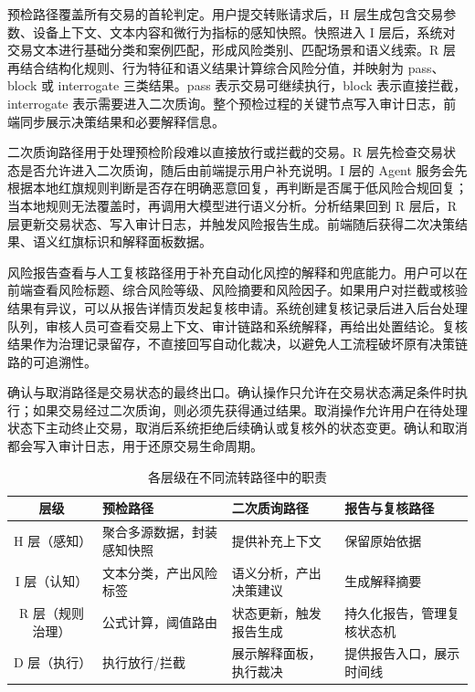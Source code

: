 \documentclass{xduugthesis}
\begin{document}
预检路径覆盖所有交易的首轮判定。用户提交转账请求后，H 层生成包含交易参数、设备上下文、文本内容和微行为指标的感知快照。快照进入 I 层后，系统对交易文本进行基础分类和案例匹配，形成风险类别、匹配场景和语义线索。R 层再结合结构化规则、行为特征和语义结果计算综合风险分值，并映射为 pass、block 或 interrogate 三类结果。pass 表示交易可继续执行，block 表示直接拦截，interrogate 表示需要进入二次质询。整个预检过程的关键节点写入审计日志，前端同步展示决策结果和必要解释信息。

二次质询路径用于处理预检阶段难以直接放行或拦截的交易。R 层先检查交易状态是否允许进入二次质询，随后由前端提示用户补充说明。I 层的 Agent 服务会先根据本地红旗规则判断是否存在明确恶意回复，再判断是否属于低风险合规回复；当本地规则无法覆盖时，再调用大模型进行语义分析。分析结果回到 R 层后，R 层更新交易状态、写入审计日志，并触发风险报告生成。前端随后获得二次决策结果、语义红旗标识和解释面板数据。

风险报告查看与人工复核路径用于补充自动化风控的解释和兜底能力。用户可以在前端查看风险标题、综合风险等级、风险摘要和风险因子。如果用户对拦截或核验结果有异议，可以从报告详情页发起复核申请。系统创建复核记录后进入后台处理队列，审核人员可查看交易上下文、审计链路和系统解释，再给出处置结论。复核结果作为治理记录留存，不直接回写自动化裁决，以避免人工流程破坏原有决策链路的可追溯性。

确认与取消路径是交易状态的最终出口。确认操作只允许在交易状态满足条件时执行；如果交易经过二次质询，则必须先获得通过结果。取消操作允许用户在待处理状态下主动终止交易，取消后系统拒绝后续确认或复核外的状态变更。确认和取消都会写入审计日志，用于还原交易生命周期。

\begin{table}[H]
    \centering
    \caption{各层级在不同流转路径中的职责}
    \label{tab:layer-flow-resp}
    \begin{tabularx}{\linewidth}{|c|Y|Y|Y|}
        \hline
        层级 & 预检路径 & 二次质询路径 & 报告与复核路径 \\
        \hline
        H 层（感知） & 聚合多源数据，封装感知快照 & 提供补充上下文 & 保留原始依据 \\
        \hline
        I 层（认知） & 文本分类，产出风险标签 & 语义分析，产出决策建议 & 生成解释摘要 \\
        \hline
        R 层（规则治理） & 公式计算，阈值路由 & 状态更新，触发报告生成 & 持久化报告，管理复核状态机 \\
        \hline
        D 层（执行） & 执行放行/拦截 & 展示解释面板，执行裁决 & 提供报告入口，展示时间线 \\
        \hline
    \end{tabularx}
\end{table}
\end{document}
